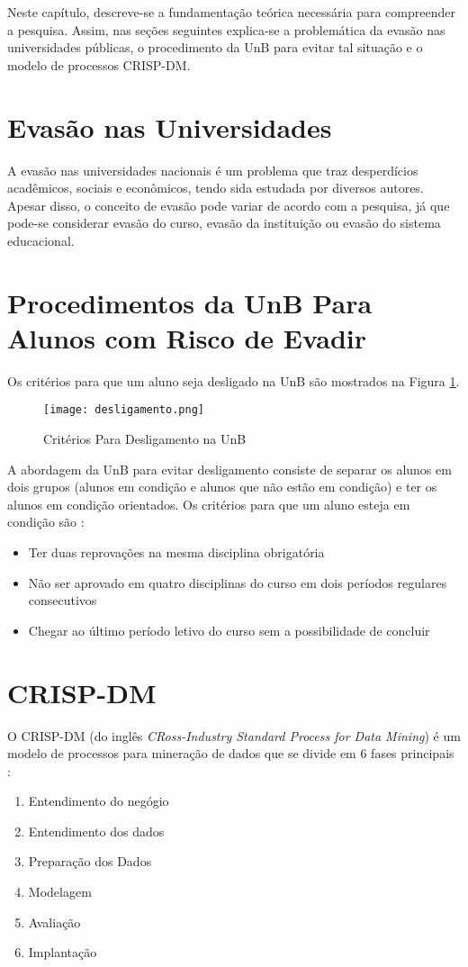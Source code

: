 Neste capítulo, descreve-se a fundamentação teórica necessária para compreender a
pesquisa. Assim, nas seções seguintes explica-se a problemática da evasão nas universidades
públicas, o procedimento da UnB para evitar tal situação e o modelo de processos
CRISP-DM. 

\section{Evasão nas Universidades} 
A evasão nas universidades nacionais é um problema que traz desperdícios acadêmicos,
sociais e econômicos, tendo sida estudada por diversos autores. Apesar disso, o
conceito de evasão pode variar \cite{mec_conceito_evasao} de acordo com a pesquisa,
já que pode-se considerar evasão do curso, evasão da instituição ou evasão do
sistema educacional. 

\section{Procedimentos da UnB Para Alunos com Risco de Evadir}
\par Os critérios para que um aluno seja desligado na UnB são mostrados na Figura
\ref{desligamento}. 
\begin{figure}[!ht]
    \caption{Critérios Para Desligamento na UnB}
    \centering
    \texttt{[image: desligamento.png]}
    \label{desligamento}
\end{figure}
 
A abordagem da UnB para evitar desligamento consiste de separar os alunos em dois
grupos (alunos em condição e alunos que não estão em condição) e ter os alunos em
condição orientados. Os critérios para que um aluno esteja em condição são
\cite{manual_calouro}: 
\begin{itemize}
    \item Ter duas reprovações na mesma disciplina obrigatória
    \item Não ser aprovado em quatro disciplinas do curso em dois períodos regulares
        consecutivos
    \item Chegar ao último período letivo do curso sem a possibilidade de concluir
\end{itemize}

\section{CRISP-DM}
O CRISP-DM (do inglês \textit{CRoss-Industry Standard Process for Data Mining}) é um
modelo de processos para mineração de dados que se divide em 6 fases principais
\cite{crispdm}:
\begin{enumerate}
    \item Entendimento do negógio
    \item Entendimento dos dados
    \item Preparação dos Dados
    \item Modelagem
    \item Avaliação
    \item Implantação
\end{enumerate}

